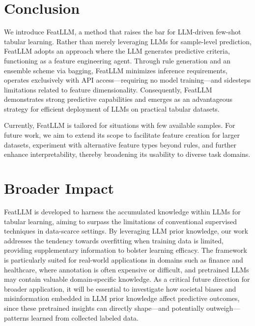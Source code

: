 \section{Conclusion}
We introduce \textsf{FeatLLM}, a method that raises the bar for LLM-driven few-shot tabular learning. Rather than merely leveraging LLMs for sample-level prediction, \textsf{FeatLLM} adopts an approach where the LLM generates predictive criteria, functioning as a feature engineering agent. Through rule generation and an ensemble scheme via bagging, \textsf{FeatLLM} minimizes inference requirements, operates exclusively with API access—requiring no model training—and sidesteps limitations related to feature dimensionality. Consequently, \textsf{FeatLLM} demonstrates strong predictive capabilities and emerges as an advantageous strategy for efficient deployment of LLMs on practical tabular datasets.

Currently, \textsf{FeatLLM} is tailored for situations with few available samples. For future work, we aim to extend its scope to facilitate feature creation for larger datasets, experiment with alternative feature types beyond rules, and further enhance interpretability, thereby broadening its usability to diverse task domains.

\section{Broader Impact}
\textsf{FeatLLM} is developed to harness the accumulated knowledge within LLMs for tabular learning, aiming to surpass the limitations of conventional supervised techniques in data-scarce settings. By leveraging LLM prior knowledge, our work addresses the tendency towards overfitting when training data is limited, providing supplementary information to bolster learning efficacy. The framework is particularly suited for real-world applications in domains such as finance and healthcare, where annotation is often expensive or difficult, and pretrained LLMs may contain valuable domain-specific knowledge. As a critical future direction for broader application, it will be essential to investigate how societal biases and misinformation embedded in LLM prior knowledge affect predictive outcomes, since these pretrained insights can directly shape—and potentially outweigh—patterns learned from collected labeled data.

